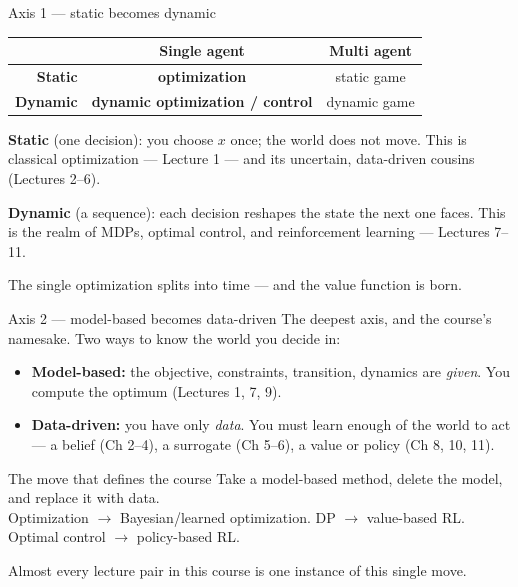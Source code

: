 \documentclass[10pt, aspectratio=169]{beamer}
\begin{document}
\begin{frame}{Axis 1 --- static becomes dynamic}
\begin{center}\footnotesize\renewcommand{\arraystretch}{1.5}
\begin{tabular}{r|c|c}
 & \textbf{Single agent} & \textbf{Multi agent} \\
\hline
\textbf{Static}  & \cellcolor{mDarkTeal!12}\textbf{optimization} & static game \\
\hline
\textbf{Dynamic} & \cellcolor{mDarkTeal!12}\textbf{dynamic optimization / control} & dynamic game \\
\end{tabular}
\end{center}
\medskip

\pause
\textbf{Static} (one decision): you choose $x$ once; the world does not move. This is classical optimization --- Lecture 1 --- and its uncertain, data-driven cousins (Lectures 2--6).
\medskip

\pause
\textbf{Dynamic} (a sequence): each decision reshapes the state the next one faces. This is the realm of MDPs, optimal control, and reinforcement learning --- Lectures 7--11.
\medskip
\pause
\begin{center}\large
The single optimization splits into time --- and the value function is born.
\end{center}
\end{frame}

\begin{frame}{Axis 2 --- model-based becomes data-driven}
The deepest axis, and the course's namesake. Two ways to know the world you decide in:
\medskip
\begin{itemize}\setlength\itemsep{3pt}
\item \textbf{Model-based:} the objective, constraints, transition, dynamics are \emph{given}. You compute the optimum (Lectures 1, 7, 9).
\item \textbf{Data-driven:} you have only \emph{data}. You must learn enough of the world to act --- a belief (Ch 2--4), a surrogate (Ch 5--6), a value or policy (Ch 8, 10, 11).
\end{itemize}
\medskip

\pause
\begin{block}{The move that defines the course}
\centering
Take a model-based method, \alert{delete the model}, and replace it with data. \\
Optimization $\to$ Bayesian/learned optimization. \;DP $\to$ value-based RL. \;Optimal control $\to$ policy-based RL.
\end{block}
\medskip
\pause
Almost every lecture pair in this course is one instance of this single move.
\end{frame}
\end{document}
